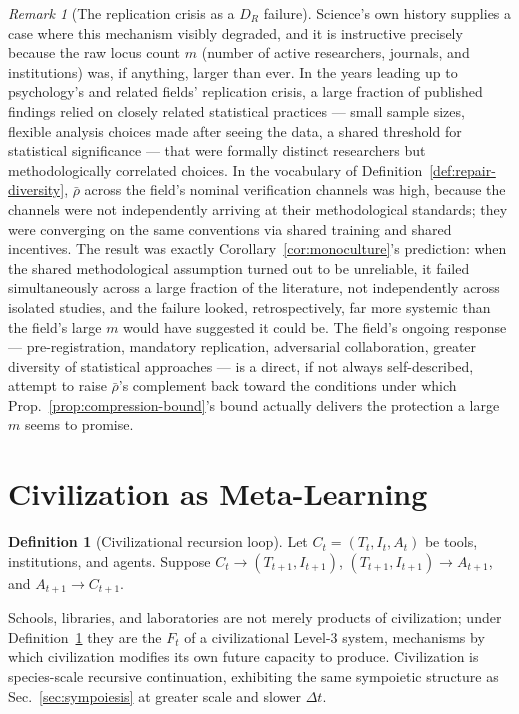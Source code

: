 \documentclass[11pt,a4paper]{article}
\theoremstyle{plain}
\theoremstyle{definition}
\newtheorem{definition}[theorem]{Definition}
\theoremstyle{remark}
\newtheorem{remark}[theorem]{Remark}
\newcommand{\DR}{D_R}
\begin{document}
\begin{remark}[The replication crisis as a $\DR$ failure]
\label{rem:replication-crisis}
Science's own history supplies a case where this mechanism visibly degraded, and it is instructive precisely because the raw locus count $m$ (number of active researchers, journals, and institutions) was, if anything, larger than ever. In the years leading up to psychology's and related fields' replication crisis, a large fraction of published findings relied on closely related statistical practices — small sample sizes, flexible analysis choices made after seeing the data, a shared threshold for statistical significance — that were formally distinct researchers but methodologically correlated choices. In the vocabulary of Definition~\ref{def:repair-diversity}, $\bar\rho$ across the field's nominal verification channels was high, because the channels were not independently arriving at their methodological standards; they were converging on the same conventions via shared training and shared incentives. The result was exactly Corollary~\ref{cor:monoculture}'s prediction: when the shared methodological assumption turned out to be unreliable, it failed simultaneously across a large fraction of the literature, not independently across isolated studies, and the failure looked, retrospectively, far more systemic than the field's large $m$ would have suggested it could be. The field's ongoing response — pre-registration, mandatory replication, adversarial collaboration, greater diversity of statistical approaches — is a direct, if not always self-described, attempt to raise $\bar\rho$'s complement back toward the conditions under which Prop.~\ref{prop:compression-bound}'s bound actually delivers the protection a large $m$ seems to promise.
\end{remark}

\section{Civilization as Meta-Learning}
\label{sec:civilization}

\begin{definition}[Civilizational recursion loop]
\label{def:civ-loop}
Let $C_t = (T_t, I_t, A_t)$ be tools, institutions, and agents. Suppose $C_t \to (T_{t+1}, I_{t+1})$, $(T_{t+1},I_{t+1}) \to A_{t+1}$, and $A_{t+1} \to C_{t+1}$.
\end{definition}

Schools, libraries, and laboratories are not merely products of civilization; under Definition~\ref{def:civ-loop} they are the $F_t$ of a civilizational Level-3 system, mechanisms by which civilization modifies its own future capacity to produce. Civilization is species-scale recursive continuation, exhibiting the same sympoietic structure as Sec.~\ref{sec:sympoiesis} at greater scale and slower $\Delta t$.
\end{document}
